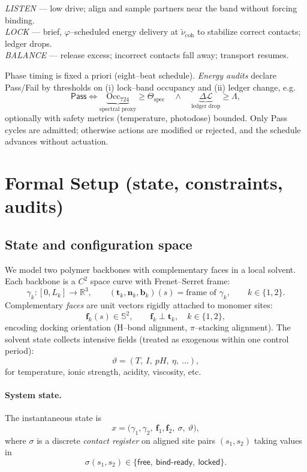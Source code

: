 \documentclass[11pt]{article}
\begin{document}
\medskip
\noindent\emph{LISTEN} — low drive; align and sample partners near the band without forcing binding.\\
\emph{LOCK} — brief, $\varphi$–scheduled energy delivery at $\tilde\nu_{\mathrm{coh}}$ to stabilize correct contacts; ledger drops.\\
\emph{BALANCE} — release excess; incorrect contacts fall away; transport resumes.

\medskip
Phase timing is fixed a priori (eight–beat schedule). \emph{Energy audits} declare \textsf{Pass/Fail} by thresholds on (i) lock–band occupancy and (ii) ledger change, e.g.
\[
\textsf{Pass}\iff 
\underbrace{\mathrm{Occ}_{724}}_{\text{spectral proxy}}\ge \Theta_{\mathrm{spec}}
\quad\wedge\quad
\underbrace{\Delta\mathcal{L}}_{\text{ledger drop}}\ge \Lambda,
\]
optionally with safety metrics (temperature, photodose) bounded. Only \textsf{Pass} cycles are admitted; otherwise actions are modified or rejected, and the schedule advances without actuation.

\section{Formal Setup (state, constraints, audits)}

\subsection{State and configuration space}
We model two polymer backbones with complementary faces in a local solvent. Each backbone is a $C^2$ space curve with Frenet--Serret frame:
\[
\gamma_k:[0,L_k]\to\mathbb{R}^3,\qquad
(\mathbf{t}_k,\mathbf{n}_k,\mathbf{b}_k)(s)=\text{frame of }\gamma_k,\qquad k\in\{1,2\}.
\]
Complementary \emph{faces} are unit vectors rigidly attached to monomer sites:
\[
\mathbf{f}_k(s)\in\mathbb{S}^2,\qquad \mathbf{f}_k\perp \mathbf{t}_k,\quad k\in\{1,2\},
\]
encoding docking orientation (H–bond alignment, $\pi$–stacking alignment). The solvent state collects intensive fields (treated as exogenous within one control period):
\[
\vartheta=(T,\ I,\ pH,\ \eta,\ \dots),
\]
for temperature, ionic strength, acidity, viscosity, etc.

\paragraph{System state.}
The instantaneous state is
\[
x=\big(\gamma_1,\gamma_2,\ \mathbf{f}_1,\mathbf{f}_2,\ \sigma,\ \vartheta\big),
\]
where $\sigma$ is a discrete \emph{contact register} on aligned site pairs $(s_1,s_2)$ taking values in
\[
\sigma(s_1,s_2)\in\{\textsf{free},\ \textsf{bind-ready},\ \textsf{locked}\}.
\]
\end{document}
